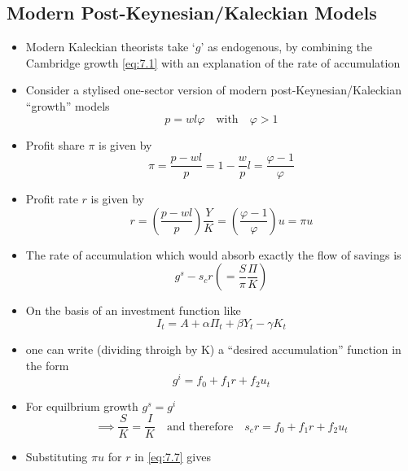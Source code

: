 \documentclass[a4paper,twoside]{article}
\numberwithin{equation}{section}
\numberwithin{figure}{section}
\begin{document}
\subsection{Modern Post-Keynesian/Kaleckian Models}
	\begin{itemize}
		\item Modern Kaleckian theorists take `\( g \)' as endogenous, by combining the Cambridge growth \cref{eq:7.1} with an explanation of the rate of accumulation
		\item Consider a stylised one-sector version of modern post-Keynesian/Kaleckian ``growth'' models
		\begin{equation}
			p = wl\varphi \quad\text{with}\quad \varphi>1 \label{eq:7.2}
		\end{equation}
		\item Profit share \( \pi \) is given by
		\begin{equation}
			\pi = \frac{p-wl}{p} = 1-\frac{w}{p}l = \frac{\varphi-1}{\varphi} \label{eq:7.3}
		\end{equation}
		\item Profit rate \( r \) is given by
		\begin{equation}
			r=\left(\frac{p-wl}{p}\right)\frac{Y}{K} = \left( \frac{\varphi-1}{\varphi} \right) u = \pi u \label{eq:7.4}
		\end{equation}
		\item The rate of accumulation which would absorb exactly the flow of savings is
		\begin{equation}
			g^s - s_c r \left( =\frac{S}{\pi}\frac{\Pi}{K} \right) \label{eq:7.5}
		\end{equation}
		\item On the basis of an investment function like
		\begin{equation}
			I_t = A + \alpha\Pi_t + \beta Y_t - \gamma K_t \label{eq:7.6}
		\end{equation}
		\item one can write (dividing throigh by K) a ``desired accumulation'' function in the form
		\begin{equation}
			g^i = f_0 + f_1r + f_2u_t \label{eq:7.7}
		\end{equation}
		\item For equilbrium growth \( g^s = g^i \)
		\begin{equation}
			\implies \frac{S}{K}=\frac{I}{K} \quad\text{and therefore}\quad s_c r = f_0+f_1r+f_2 u_t \label{eq:7.8}
		\end{equation}
		\item Substituting \( \pi u \) for \( r \) in \cref{eq:7.7} gives

\end{itemize}
\end{document}
